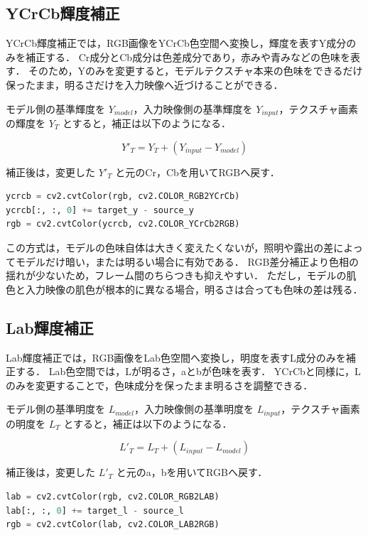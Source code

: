 \documentclass[uplatex,dvipdfmx]{jsarticle}
\begin{document}
\subsection{YCrCb輝度補正}

YCrCb輝度補正では，RGB画像をYCrCb色空間へ変換し，輝度を表すY成分のみを補正する．
Cr成分とCb成分は色差成分であり，赤みや青みなどの色味を表す．
そのため，Yのみを変更すると，モデルテクスチャ本来の色味をできるだけ保ったまま，明るさだけを入力映像へ近づけることができる．

モデル側の基準輝度を $Y_{model}$，入力映像側の基準輝度を $Y_{input}$，テクスチャ画素の輝度を $Y_T$ とすると，補正は以下のようになる．

\begin{equation}
  Y'_T = Y_T + (Y_{input} - Y_{model})
\end{equation}

補正後は，変更した $Y'_T$ と元のCr，Cbを用いてRGBへ戻す．

\begin{lstlisting}[language=Python]
ycrcb = cv2.cvtColor(rgb, cv2.COLOR_RGB2YCrCb)
ycrcb[:, :, 0] += target_y - source_y
rgb = cv2.cvtColor(ycrcb, cv2.COLOR_YCrCb2RGB)
\end{lstlisting}

この方式は，モデルの色味自体は大きく変えたくないが，照明や露出の差によってモデルだけ暗い，または明るい場合に有効である．
RGB差分補正より色相の揺れが少ないため，フレーム間のちらつきも抑えやすい．
ただし，モデルの肌色と入力映像の肌色が根本的に異なる場合，明るさは合っても色味の差は残る．

\subsection{Lab輝度補正}

Lab輝度補正では，RGB画像をLab色空間へ変換し，明度を表すL成分のみを補正する．
Lab色空間では，Lが明るさ，aとbが色味を表す．
YCrCbと同様に，Lのみを変更することで，色味成分を保ったまま明るさを調整できる．

モデル側の基準明度を $L_{model}$，入力映像側の基準明度を $L_{input}$，テクスチャ画素の明度を $L_T$ とすると，補正は以下のようになる．

\begin{equation}
  L'_T = L_T + (L_{input} - L_{model})
\end{equation}

補正後は，変更した $L'_T$ と元のa，bを用いてRGBへ戻す．

\begin{lstlisting}[language=Python]
lab = cv2.cvtColor(rgb, cv2.COLOR_RGB2LAB)
lab[:, :, 0] += target_l - source_l
rgb = cv2.cvtColor(lab, cv2.COLOR_LAB2RGB)
\end{lstlisting}
\end{document}
